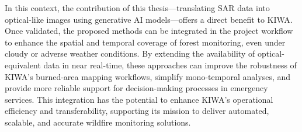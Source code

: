 In this context, the contribution of this thesis—translating SAR data into optical-like images using generative AI models—offers a direct benefit to KIWA. Once validated, the proposed methods can be integrated in the project workflow to enhance the spatial and temporal coverage of forest monitoring, even under cloudy or adverse weather conditions. By extending the availability of optical-equivalent data in near real-time, these approaches can improve the robustness of KIWA’s burned-area mapping workflows, simplify mono-temporal analyses, and provide more reliable support for decision-making processes in emergency services. This integration has the potential to enhance KIWA’s operational efficiency and transferability, supporting its mission to deliver automated, scalable, and accurate wildfire monitoring solutions.

